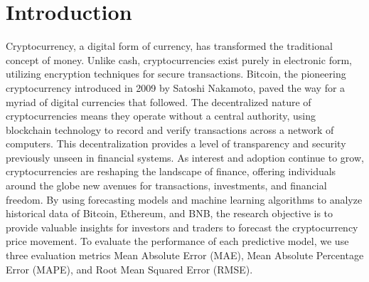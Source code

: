\documentclass{ieeeojies}
\begin{document}
\section{Introduction}
\label{sec:introduction}
Cryptocurrency, a digital form of currency, has transformed the traditional concept of money. Unlike cash, cryptocurrencies exist purely in electronic form, utilizing encryption techniques for secure transactions. Bitcoin, the pioneering cryptocurrency introduced in 2009 by Satoshi Nakamoto, paved the way for a myriad of digital currencies that followed. The decentralized nature of cryptocurrencies means they operate without a central authority, using blockchain technology to record and verify transactions across a network of computers. This decentralization provides a level of transparency and security previously unseen in financial systems. As interest and adoption continue to grow, cryptocurrencies are reshaping the landscape of finance, offering individuals around the globe new avenues for transactions, investments, and financial freedom. \newline
By using forecasting models and machine learning algorithms to analyze historical data of Bitcoin, Ethereum, and BNB, the research objective is to provide valuable insights for investors and traders to forecast the cryptocurrency price movement. To evaluate the performance of each predictive model, we use three evaluation metrics Mean Absolute Error (MAE), Mean Absolute Percentage Error (MAPE), and Root Mean Squared Error (RMSE).
\end{document}
